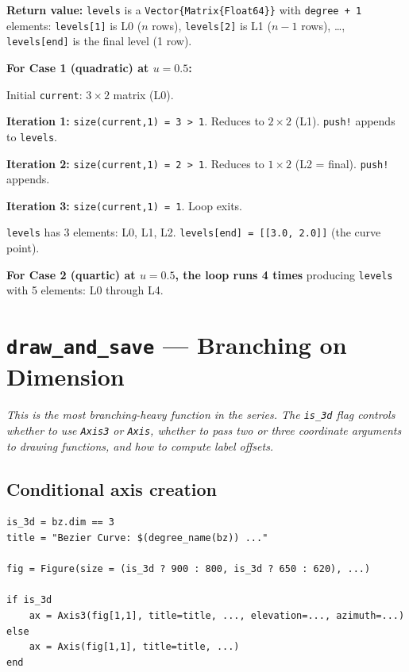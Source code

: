 \documentclass[12pt, a4paper]{article}
\newcommand{\cd}[1]{\texttt{#1}}
\begin{document}
\textbf{Return value:}
\cd{levels} is a \cd{Vector\{Matrix\{Float64\}\}} with
\cd{degree + 1} elements:
\cd{levels[1]} is L0 ($n$ rows),
\cd{levels[2]} is L1 ($n-1$ rows), \ldots,
\cd{levels[end]} is the final level (1 row).

\begin{examplebox}
\textbf{For Case 1 (quadratic) at $u=0.5$:}

Initial \cd{current}: $3\times2$ matrix (L0).

\textbf{Iteration 1:} \cd{size(current,1) = 3 > 1}.
Reduces to $2\times2$ (L1). \cd{push!} appends to \cd{levels}.

\textbf{Iteration 2:} \cd{size(current,1) = 2 > 1}.
Reduces to $1\times2$ (L2 = final). \cd{push!} appends.

\textbf{Iteration 3:} \cd{size(current,1) = 1}. Loop exits.

\cd{levels} has 3 elements: L0, L1, L2.
\cd{levels[end] = [[3.0, 2.0]]} (the curve point). \checkmark

\medskip
\textbf{For Case 2 (quartic) at $u=0.5$, the loop runs 4 times}
producing \cd{levels} with 5 elements: L0 through L4.
\end{examplebox}


\section{\texttt{draw\_and\_save} --- Branching on Dimension}

\textit{This is the most branching-heavy function in the series.
The \cd{is\_3d} flag controls whether to use \cd{Axis3} or
\cd{Axis}, whether to pass two or three coordinate arguments
to drawing functions, and how to compute label offsets.}

\subsection{Conditional axis creation}

\begin{verbatim}
is_3d = bz.dim == 3
title = "Bezier Curve: $(degree_name(bz)) ..."

fig = Figure(size = (is_3d ? 900 : 800, is_3d ? 650 : 620), ...)

if is_3d
    ax = Axis3(fig[1,1], title=title, ..., elevation=..., azimuth=...)
else
    ax = Axis(fig[1,1], title=title, ...)
end
\end{verbatim}
\end{document}
